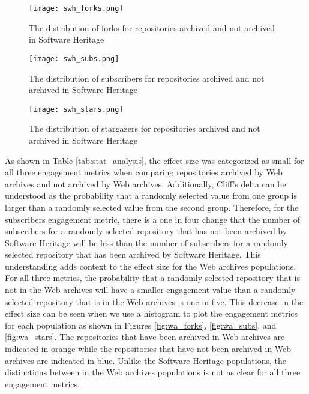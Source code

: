 \begin{figure}
    \centering
    \texttt{[image: swh\_forks.png]}
    \caption{The distribution of forks for repositories archived and not archived in Software Heritage}
    \label{fig:swh_forks}
\end{figure}

\begin{figure}
    \centering
    \texttt{[image: swh\_subs.png]}
    \caption{The distribution of subscribers for repositories archived and not archived in Software Heritage}
    \label{fig:swh_subs}
\end{figure}

\begin{figure}
    \centering
    \texttt{[image: swh\_stars.png]}
    \caption{The distribution of stargazers for repositories archived and not archived in Software Heritage}
    \label{fig:swh_stars}
\end{figure}

As shown in Table \ref{tab:stat_analysis}, the effect size was categorized as small for all three engagement metrics when comparing repositories archived by Web archives and not archived by Web archives. Additionally, Cliff's delta can be understood as the probability that a randomly selected value from one group is larger than a randomly selected value from the second group. Therefore, for the subscribers engagement metric, there is a one in four change that the number of subscribers for a randomly selected repository that has not been archived by Software Heritage will be less than the number of subscribers for a randomly selected repository that has been archived by Software Heritage. This understanding adds context to the effect size for the Web archives populations. For all three metrics, the probability that a randomly selected repository that is not in the Web archives will have a smaller engagement value than a randomly selected repository that is in the Web archives is one in five. This decrease in the effect size can be seen when we use a histogram to plot the engagement metrics for each population as shown in Figures \ref{fig:wa_forks}, \ref{fig:wa_subs}, and \ref{fig:wa_stars}. The repositories that have been archived in Web archives are indicated in orange while the repositories that have not been archived in Web archives are indicated in blue. Unlike the Software Heritage populations, the distinctions between in the Web archives populations is not as clear for all three engagement metrics. 


